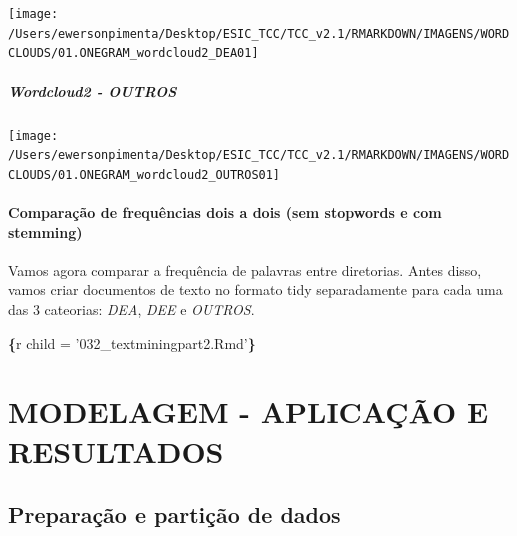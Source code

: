 \documentclass[]{article}
\newenvironment{Shaded}{\begin{snugshade}}{\end{snugshade}}
\newcommand{\CommentTok}[1]{\textcolor[rgb]{0.56,0.35,0.01}{\textit{#1}}}
\newcommand{\KeywordTok}[1]{\textcolor[rgb]{0.13,0.29,0.53}{\textbf{#1}}}
\newcommand{\NormalTok}[1]{#1}
\newcommand{\StringTok}[1]{\textcolor[rgb]{0.31,0.60,0.02}{#1}}
\let\oldparagraph\paragraph
\renewcommand{\paragraph}[1]{\oldparagraph{#1}\mbox{}}
\let\oldsubparagraph\subparagraph
\renewcommand{\subparagraph}[1]{\oldsubparagraph{#1}\mbox{}}
\begin{document}
\texttt{[image: /Users/ewersonpimenta/Desktop/ESIC\_TCC/TCC\_v2.1/RMARKDOWN/IMAGENS/WORDCLOUDS/01.ONEGRAM\_wordcloud2\_DEA01]}

\hypertarget{wordcloud2---outros}{%
\subparagraph{Wordcloud2 - OUTROS}\label{wordcloud2---outros}}

\begin{Shaded}
\end{Shaded}

\texttt{[image: /Users/ewersonpimenta/Desktop/ESIC\_TCC/TCC\_v2.1/RMARKDOWN/IMAGENS/WORDCLOUDS/01.ONEGRAM\_wordcloud2\_OUTROS01]}

\hypertarget{comparacao-de-frequencias-dois-a-dois-sem-stopwords-e-com-stemming}{%
\paragraph{Comparação de frequências dois a dois (sem stopwords e com
stemming)}\label{comparacao-de-frequencias-dois-a-dois-sem-stopwords-e-com-stemming}}

Vamos agora comparar a frequência de palavras entre diretorias. Antes
disso, vamos criar documentos de texto no formato tidy separadamente
para cada uma das 3 cateorias: \emph{DEA}, \emph{DEE} e \emph{OUTROS}.

\begin{Shaded}
\begin{Highlighting}[]
\KeywordTok{\{}\NormalTok{r child = '032_textminingpart2.Rmd'}\KeywordTok{\}}
\end{Highlighting}
\end{Shaded}

\hypertarget{modelagem---aplicacao-e-resultados}{%
\section{MODELAGEM - APLICAÇÃO E
RESULTADOS}\label{modelagem---aplicacao-e-resultados}}

\hypertarget{preparacao-e-particao-de-dados}{%
\subsection{Preparação e partição de
dados}\label{preparacao-e-particao-de-dados}}
\end{document}
